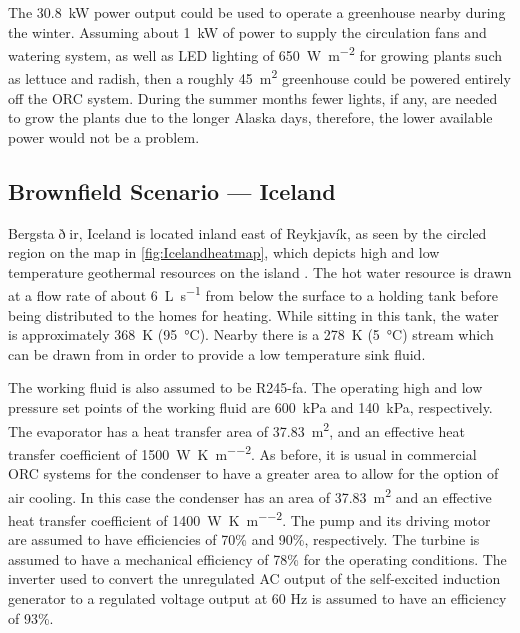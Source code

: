 The \SI{30.8}{\kilo\watt} power output could be used to operate a greenhouse nearby during the winter. Assuming about \SI{1}{\kilo\watt} of power to supply the circulation fans and watering system, as well as LED lighting of 
\SI{650}{\watt\per\meter\squared} \cite{Tamulaitis2005} for growing plants such as lettuce and radish, then a roughly \SI{45}{\meter\squared} greenhouse could be powered entirely off the ORC system. During the summer months fewer lights, if any, are needed to grow the plants due to the longer Alaska days, therefore, the lower available power would not be a problem.

\subsection{Brownfield Scenario --- Iceland}
Bergsta$\eth$ir, Iceland is located inland east of Reykjavík, as seen by the circled region on the map in \autoref{fig:Icelandheatmap}, which depicts high and low temperature geothermal resources on the island \cite{Loftsdottir2006}. The hot water resource is drawn at a flow rate of about \SI{6}{\liter\per\second} from below the surface to a holding tank before being distributed to the homes for heating. While sitting in this tank, the water is approximately \SI{368}{\kelvin} (\SI{95}{\degreeCelsius}). Nearby there is a \SI{278}{\kelvin} (\SI{5}{\degreeCelsius}) stream which can be drawn from in order to provide a low temperature sink fluid.


The working fluid is also assumed to be R245-fa. The operating high and low pressure set points of the working fluid are \SI{600}{\kilo\pascal} and \SI{140}{\kilo\pascal}, respectively. The evaporator has a heat transfer area of \SI{37.83}{\meter\squared}, and an effective heat transfer coefficient of \SI{1500}{\watt\per\kelvin\per\meter\squared}. As before, it is usual in commercial ORC systems for the condenser to have a greater area to allow for the option of air cooling. In this case the condenser has an area of \SI{37.83}{\meter\squared} and an effective heat transfer coefficient of \SI{1400}{\watt\per\kelvin\per\meter\squared}. The pump and its driving motor are assumed to have efficiencies of 70\% and 90\%, respectively. The turbine is assumed to have a mechanical efficiency of 78\% for the operating conditions.
The inverter used to convert the unregulated AC output of the self-excited induction generator to a regulated voltage output at 60 Hz is assumed to have an efficiency of 93\%.

